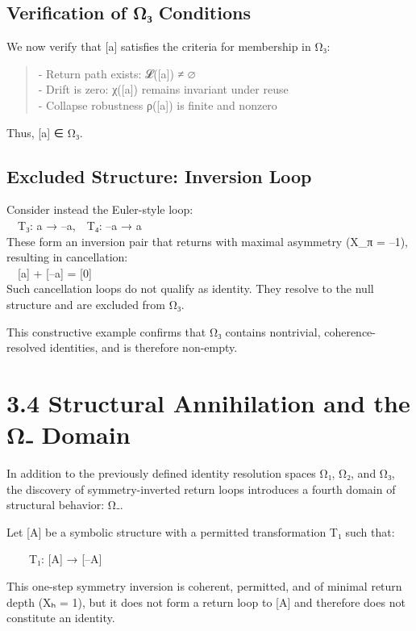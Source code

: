 \subsection{Verification of Ω₃
Conditions}\label{verification-of-ux3c9ux2083-conditions}

We now verify that {[}a{]} satisfies the criteria for membership in Ω₃:

\begin{quote}
- Return path exists: 𝓛({[}a{]}) ≠ ∅\\
- Drift is zero: χ({[}a{]}) remains invariant under reuse\\
- Collapse robustness ρ({[}a{]}) is finite and nonzero
\end{quote}

Thus, {[}a{]} ∈ Ω₃.

\subsection{Excluded Structure: Inversion
Loop}\label{excluded-structure-inversion-loop}

Consider instead the Euler-style loop:\\
 T₃: a → --a, T₄: --a → a\\
These form an inversion pair that returns with maximal asymmetry (X\_π =
--1), resulting in cancellation:\\
 {[}a{]} + {[}--a{]} = {[}0{]}\\
Such cancellation loops do not qualify as identity. They resolve to the
null structure and are excluded from Ω₃.

This constructive example confirms that Ω₃ contains nontrivial,
coherence-resolved identities, and is therefore non-empty.

\section{3.4 \textbar{} Structural Annihilation and the Ω₋
Domain}\label{structural-annihilation-and-the-ux3c9-domain}

In addition to the previously defined identity resolution spaces Ω₁, Ω₂,
and Ω₃, the discovery of symmetry-inverted return loops introduces a
fourth domain of structural behavior: Ω₋.

Let {[}A{]} be a symbolic structure with a permitted transformation T₁
such that:

  T₁: {[}A{]} → {[}--A{]}

This one-step symmetry inversion is coherent, permitted, and of minimal
return depth (Xₕ = 1), but it does not form a return loop to {[}A{]} and
therefore does not constitute an identity.

